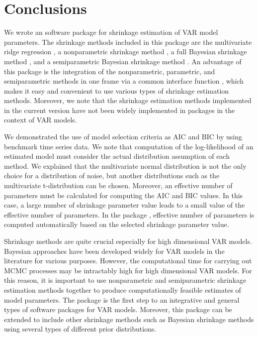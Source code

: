 \documentclass[
]{jss}
\begin{document}
\hypertarget{conclusions}{%
\section{Conclusions}\label{conclusions}}

We wrote an  software package  for shrinkage
estimation of VAR model parameters. The shrinkage methods included in
this package are the multivariate ridge regression
\citep{Hoerl70, Golub79}, a nonparametric shrinkage method
\citep{Rhein07c}, a full Bayesian shrinkage method \citep{Ni05}, and a
semiparametric Bayesian shrinkage method \citep{LeeChoiKim2016}. An
advantage of this package is the integration of the nonparametric,
parametric, and semiparametric methods in one frame via a common
interface function , which makes it easy and
convenient to use various types of shrinkage estimation methods.
Moreover, we note that the shrinkage estimation methods implemented in
the current version have not been widely implemented in 
packages in the context of VAR models.

We demonstrated the use of model selection criteria as AIC and BIC by
using benchmark time series data. We note that computation of the
log-likelihood of an estimated model must consider the actual
distribution assumption of each method. We explained that the
multivariate normal distribution is not the only choice for a
distribution of noise, but another distributions such as the
multivariate t-distribution can be chosen. Moreover, an effective number
of parameters must be calculated for computing the AIC and BIC values.
In this case, a large number of shrinkage parameter value leads to a
small value of the effective number of parameters. In the package
, effective number of parameters is computed
automatically based on the selected shrinkage parameter value.

Shrinkage methods are quite crucial especially for high dimensional VAR
models. Bayesian approaches have been developed widely for VAR models in
the literature for various purposes. However, the computational time for
carrying out MCMC processes may be intractably high for high dimensional
VAR models. For this reason, it is important to use nonparametric and
semiparametric shrinkage estimation methods together to produce
computationally feasible estimates of model parameters. The 
package  is the first step to an integrative and general
types of software packages for VAR models. Moreover, this package can be
extended to include other shrinkage methods such as Bayesian shrinkage
methods using several types of different prior distributions.

\renewcommand\refname{References}

\end{document}
